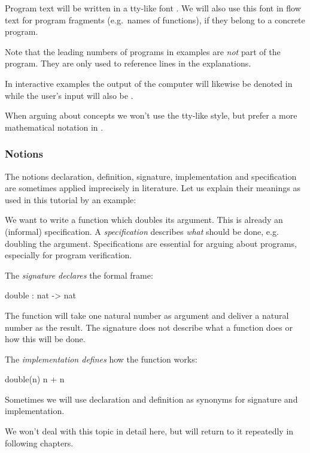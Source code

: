  Program text will be written in a tty-like font .
We will also use this font in flow text for program fragments
(e.g.~names of functions), if they belong to a concrete program. 

Note that the leading numbers  of programs in examples are {\em not}
part of the program. They are only used to reference lines
in the explanations.

In interactive examples the output of the computer will likewise be
denoted in  while the user's input will also be
\underline{}.

When arguing about concepts we won't use the tty-like style, but prefer a
more mathematical notation in . 


\subsubsection{Notions}
\novice 
 The notions declaration, definition, signature,
implementation and specification are sometimes applied imprecisely in
literature.
Let us explain their meanings as used in this tutorial by an example:

We want to write a function which doubles its argument.
This is already an (informal) specification.
A {\em specification\/} describes {\em what\/} should be done, e.g.~
doubling the argument.
Specifications are essential for arguing about programs, especially
for program verification.

The {\em signature declares\/} the formal frame:
\begin{prog}
 double : nat -> nat
\end{prog}

The function  will take one natural number as argument and
deliver a natural number as the result.
The signature does not describe what a function does or how this will
be done.

The {\em implementation defines\/} how the function works:
\begin{prog}
 double(n) \key{==} n + n
\end{prog}

Sometimes we will use  declaration and definition as synonyms for
signature and implementation.

We won't deal with this topic in detail here, but will return to it
repeatedly in following chapters.

